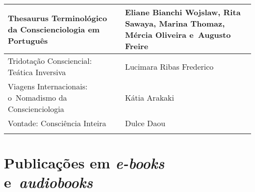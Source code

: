 \documentclass{gescons}
\begin{document}
\begin{longtable}[]{@{}
  >{\raggedright\arraybackslash}p{}
  >{\raggedright\arraybackslash}p{}@{}}
\hline
\begin{minipage}[b]{\linewidth}\raggedright
Thesaurus Terminológico da Conscienciologia em Português
\end{minipage} & \begin{minipage}[b]{\linewidth}\raggedright\addlinespace[2pt]
Eliane Bianchi Wojslaw, Rita Sawaya, Marina Thomaz, Mércia Oliveira e~Augusto Freire
\end{minipage} \\
\hline
\begin{minipage}[b]{\linewidth}\raggedright
Tridotação Consciencial: Teática Inversiva
\end{minipage} & \begin{minipage}[b]{\linewidth}\raggedright
Lucimara Ribas Frederico
\end{minipage} \\
\hline
\begin{minipage}[b]{\linewidth}\raggedright
Viagens Internacionais: o~Nomadismo da Conscienciologia
\end{minipage} & \begin{minipage}[b]{\linewidth}\raggedright
Kátia Arakaki
\end{minipage} \\
\hline
\begin{minipage}[b]{\linewidth}\raggedright
Vontade: Consciência Inteira
\end{minipage} & \begin{minipage}[b]{\linewidth}\raggedright
Dulce Daou
\end{minipage} \\
\midrule\noalign{}
\endhead
\bottomrule\noalign{}
\endlastfoot
\end{longtable}

\clearpage
{}
\section*{Publicações em \emph{e-books} e~\emph{audiobooks}}
\end{document}
